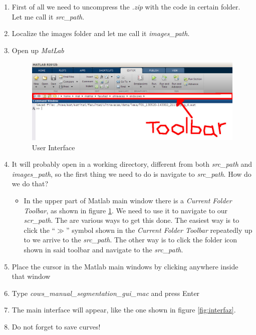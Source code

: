 \documentclass[12pt,a4paper,titlepage]{report}
\begin{document}
\begin{enumerate}
	\item First of all we need to uncompress the \emph{.zip} with the code in certain folder. Let me call it \emph{src\_path}.
	\item Localize the images folder and let me call it \emph{images\_path}.
	\item Open up \emph{MatLab}

	\begin{figure}[h!]
		\begin{center}
		\includegraphics[width=.7\textwidth]{toolbar.jpg}
		\end{center}
		\caption{User Interface}
		\label{fig:toolbar}
	\end{figure}

	\item It will probably open in a working directory, different from both \emph{src\_path} and \emph{images\_path}, so the first thing we need to do is navigate to \emph{src\_path}. How do we do that? 
	\begin{itemize}
		\item In the upper part of Matlab main window there is a \emph{Current Folder Toolbar}, as shown in figure \ref{fig:toolbar}. We need to use it to navigate to our \emph{scr\_path}. The are various ways to get this done. The easiest way is to click the ``$\gg$'' symbol shown in the \emph{Current Folder Toolbar} repeatedly up to we arrive to the \emph{src\_path}. The other way is to click the folder icon shown in said toolbar and navigate to the \emph{src\_path}.
	\end{itemize}
	\item Place the cursor in the Matlab main windows by clicking anywhere inside that window
	\item Type \emph{cows\_manual\_segmentation\_gui\_mac} and press Enter
	\item The main interface will appear, like the one shown in figure \ref{fig:interfaz}.
	\item Do not forget to save curves!
\end{enumerate}
\end{document}
